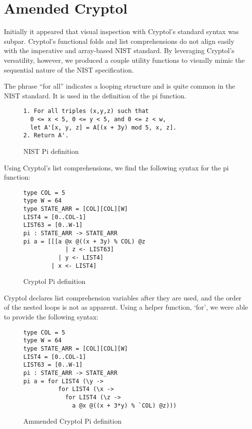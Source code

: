 \section{Amended Cryptol}\label{sec:amended}
Initially it appeared that visual inspection with Cryptol’s standard syntax was subpar.
Cryptol’s functional folds and list comprehensions do not align easily with the imperative 
and array-based NIST standard. By leveraging Cryptol’s versatility, however, we produced a couple 
utility functions to visually mimic the sequential nature of the NIST specification. 

The phrase “for all” indicates a looping structure and is quite common in the NIST standard. 
It is used in the definition of the pi function.

\begin{figure}[h]
  \centering
  \begin{verbatim}
1. For all triples (x,y,z) such that 
  0 <= x < 5, 0 <= y < 5, and 0 <= z < w,
  let A'[x, y, z] = A[(x + 3y) mod 5, x, z].
2. Return A'.
  \end{verbatim}
  \caption{NIST Pi definition}
  \label{fig:nistPi}
\end{figure}
    
Using Cryptol's list comprehensions, we find the following syntax for the pi function:

\begin{figure}[h]
  \centering
\begin{verbatim}
type COL = 5 
type W = 64
type STATE_ARR = [COL][COL][W]
LIST4 = [0..COL-1]
LIST63 = [0..W-1]
pi : STATE_ARR -> STATE_ARR
pi a = [[[a @x @((x + 3y) % COL) @z 
            | z <- LIST63] 
          | y <- LIST4] 
        | x <- LIST4]
\end{verbatim}
\caption{Cryptol Pi definition}
\label{fig:cryptolPi}
\end{figure}

Cryptol declares list comprehension variables after they are used, and the order of the
nested loops is not as apparent. Using a helper function, ‘for’, we were able to provide
the following syntax:

\begin{figure}[h]
  \centering
\begin{verbatim}
type COL = 5 
type W = 64
type STATE_ARR = [COL][COL][W]
LIST4 = [0..COL-1]
LIST63 = [0..W-1]
pi : STATE_ARR -> STATE_ARR
pi a = for LIST4 (\y ->
          for LIST4 (\x -> 
            for LIST4 (\z -> 
              a @x @((x + 3*y) % `COL) @z)))
\end{verbatim}
\caption{Ammended Cryptol Pi definition}
\label{fig:cryptolAmmendedPi}
\end{figure}

